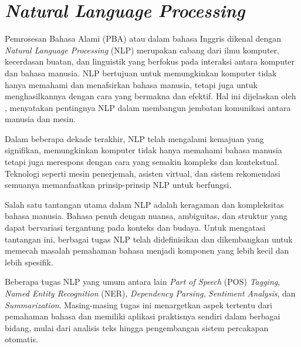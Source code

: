 \section{\textit{Natural Language Processing}}

Pemrosesan Bahasa Alami (PBA) atau dalam bahasa Inggris dikenal dengan \textit{Natural Language Processing} (NLP) merupakan cabang dari ilmu komputer, kecerdasan buatan, dan linguistik yang berfokus pada interaksi antara komputer dan bahasa manusia. NLP bertujuan untuk memungkinkan komputer tidak hanya memahami dan menafsirkan bahasa manusia, tetapi juga untuk menghasilkannya dengan cara yang bermakna dan efektif. Hal ini dijelaskan oleh \citeauthor{nlp} \parencite{nlp}, menyatakan pentingnya NLP dalam membangun jembatan komunikasi antara manusia dan mesin.

Dalam beberapa dekade terakhir, NLP telah mengalami kemajuan yang signifikan, memungkinkan komputer tidak hanya memahami bahasa manusia tetapi juga merespons dengan cara yang semakin kompleks dan kontekstual. Teknologi seperti mesin penerjemah, asisten virtual, dan sistem rekomendasi semuanya memanfaatkan prinsip-prinsip NLP untuk berfungsi.

Salah satu tantangan utama dalam NLP adalah keragaman dan kompleksitas bahasa manusia. Bahasa penuh dengan nuansa, ambiguitas, dan struktur yang dapat bervariasi tergantung pada konteks dan budaya. Untuk mengatasi tantangan ini, berbagai tugas NLP telah didefinisikan dan dikembangkan untuk memecah masalah pemahaman bahasa menjadi komponen yang lebih kecil dan lebih spesifik.

Beberapa tugas NLP yang umum antara lain \textit{Part of Speech} (POS) \textit{Tagging}, \textit{Named Entity Recognition} (NER), \textit{Dependency Parsing}, \textit{Sentiment Analysis}, dan \textit{Summarization}. Masing-masing tugas ini menargetkan aspek tertentu dari pemahaman bahasa dan memiliki aplikasi praktisnya sendiri dalam berbagai bidang, mulai dari analisis teks hingga pengembangan sistem percakapan otomatis.
